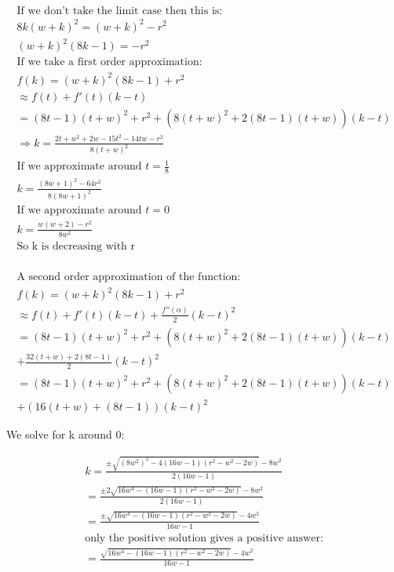 \begin{align*}
\text{If we don't take the limit case then this is:} \\
8k(w+k)^2= \left( w+k \right)^2 -r^2 \\
(w+k)^2(8k-1)=-r^2 \\
\text{If we take a first order approximation:} \\
f(k)= (w+k)^2(8k-1)+r^2 
\\
\approx f(t)+f'(t)(k-t) \\
=(8 t-1) (t+w)^2+r^2 
+(8 (t+w)^2+2 (8 t-1) (t+w))(k-t) \\
\Rightarrow k = \frac{2 t+w^2+2 w-15 t^2-14 t w-r^2}{8 (t+w)^2}
\\
\text{If we approximate around $t=\frac{1}{8}$} \\
k = \frac{(8 w+1)^2-64 r^2}{8 (8 w+1)^2} 
\\
\text{If we approximate around $t=0$} \\
k= \frac{w (w+2)-r^2}{8 w^2}
\\
\text{So k is decreasing with r} \\
\end{align*}

\begin{align*}
\text{A second order approximation of the function:} \\ 
f(k)= (w+k)^2(8k-1)+r^2 \\
\approx f(t)+f'(t)(k-t)+\frac{f''(\alpha)}{2}(k-t)^2 \\
= (8 t-1) (t+w)^2+r^2 
+(8 (t+w)^2+2 (8 t-1) (t+w))(k-t) \\
+\frac{32 (t+w)+2 (8 t-1)}{2}(k-t)^2 \\
= (8 t-1) (t+w)^2+r^2 
+(8 (t+w)^2+2 (8 t-1) (t+w))(k-t) \\
+(16 (t+w)+ (8 t-1))(k-t)^2 
\end{align*}



We solve for k around 0: 

\begin{align*}
k = \frac{\pm \sqrt{\left(8 w^2\right)^2-4 (16 w-1) \left(r^2-w^2-2 w\right)}-8 w^2}{2(16 w-1)} \\
=\frac{\pm 2 \sqrt{16 w^4- (16 w-1) \left(r^2-w^2-2 w\right)}-8 w^2}{2(16 w-1)} \\
=\frac{\pm \sqrt{16 w^4- (16 w-1) \left(r^2-w^2-2 w\right)}-4 w^2}{16 w-1} \\
\text{only the positive solution gives a positive answer:} \\
= \frac{ \sqrt{16 w^4- (16 w-1) \left(r^2-w^2-2 w\right)}-4 w^2}{16 w-1}
\end{align*}





